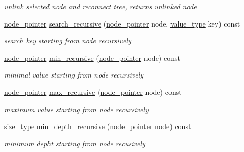 \begin{DoxyCompactItemize}
\begin{DoxyCompactList}\small\item\em unlink selected node and reconnect tree, returns unlinked node \end{DoxyCompactList}\item 
\hyperlink{structcrap_1_1tree__node_a66cd96114fc5aaf9806032e15960edc5}{node\-\_\-pointer} \hyperlink{structcrap_1_1tree__node_adf58255d40f892133308fe4b121ed667}{search\-\_\-recursive} (\hyperlink{structcrap_1_1tree__node_a66cd96114fc5aaf9806032e15960edc5}{node\-\_\-pointer} node, \hyperlink{structcrap_1_1tree__node_a3550078366894313cdaa29f2fe684587}{value\-\_\-type} key) const 
\begin{DoxyCompactList}\small\item\em search key starting from node recursively \end{DoxyCompactList}\item 
\hyperlink{structcrap_1_1tree__node_a66cd96114fc5aaf9806032e15960edc5}{node\-\_\-pointer} \hyperlink{structcrap_1_1tree__node_a3b0c55a39665a4cf00e6ee0e692ca0c2}{min\-\_\-recursive} (\hyperlink{structcrap_1_1tree__node_a66cd96114fc5aaf9806032e15960edc5}{node\-\_\-pointer} node) const 
\begin{DoxyCompactList}\small\item\em minimal value starting from node recursively \end{DoxyCompactList}\item 
\hyperlink{structcrap_1_1tree__node_a66cd96114fc5aaf9806032e15960edc5}{node\-\_\-pointer} \hyperlink{structcrap_1_1tree__node_a17dac2ad27ace7ff998ee1c4ccc7e1c0}{max\-\_\-recursive} (\hyperlink{structcrap_1_1tree__node_a66cd96114fc5aaf9806032e15960edc5}{node\-\_\-pointer} node) const 
\begin{DoxyCompactList}\small\item\em maximum value starting from node recursively \end{DoxyCompactList}\item 
\hyperlink{structcrap_1_1tree__node_a78f219a12c6715d77966184e41efc4cd}{size\-\_\-type} \hyperlink{structcrap_1_1tree__node_aa4d7c9fc5b3b3156fb95c7c558b19f77}{min\-\_\-depth\-\_\-recursive} (\hyperlink{structcrap_1_1tree__node_a66cd96114fc5aaf9806032e15960edc5}{node\-\_\-pointer} node) const 
\begin{DoxyCompactList}\small\item\em minimum depht starting from node recusively \end{DoxyCompactList}\item 

\end{DoxyCompactItemize}
